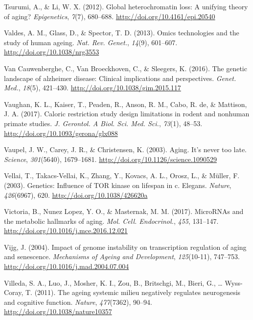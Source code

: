\documentclass[12pt,twoside]{unicam}
\begin{document}
\begin{cslreferences}
\leavevmode\hypertarget{ref-Tsurumi2012}{}%
Tsurumi, A., \& Li, W. X. (2012). Global heterochromatin loss: A unifying theory of aging? \emph{Epigenetics}, \emph{7}(7), 680--688. \url{http://doi.org/10.4161/epi.20540}

\leavevmode\hypertarget{ref-Valdes2013}{}%
Valdes, A. M., Glass, D., \& Spector, T. D. (2013). Omics technologies and the study of human ageing. \emph{Nat. Rev. Genet.}, \emph{14}(9), 601--607. \url{http://doi.org/10.1038/nrg3553}

\leavevmode\hypertarget{ref-VanCauwenberghe2016}{}%
Van Cauwenberghe, C., Van Broeckhoven, C., \& Sleegers, K. (2016). The genetic landscape of alzheimer disease: Clinical implications and perspectives. \emph{Genet. Med.}, \emph{18}(5), 421--430. \url{http://doi.org/10.1038/gim.2015.117}

\leavevmode\hypertarget{ref-Vaughan2017}{}%
Vaughan, K. L., Kaiser, T., Peaden, R., Anson, R. M., Cabo, R. de, \& Mattison, J. A. (2017). Caloric restriction study design limitations in rodent and nonhuman primate studies. \emph{J. Gerontol. A Biol. Sci. Med. Sci.}, \emph{73}(1), 48--53. \url{http://doi.org/10.1093/gerona/glx088}

\leavevmode\hypertarget{ref-Vaupel2003}{}%
Vaupel, J. W., Carey, J. R., \& Christensen, K. (2003). Aging. It's never too late. \emph{Science}, \emph{301}(5640), 1679--1681. \url{http://doi.org/10.1126/science.1090529}

\leavevmode\hypertarget{ref-Vellai2003}{}%
Vellai, T., Takacs-Vellai, K., Zhang, Y., Kovacs, A. L., Orosz, L., \& Müller, F. (2003). Genetics: Influence of TOR kinase on lifespan in c. Elegans. \emph{Nature}, \emph{426}(6967), 620. \url{http://doi.org/10.1038/426620a}

\leavevmode\hypertarget{ref-Victoria2017}{}%
Victoria, B., Nunez Lopez, Y. O., \& Masternak, M. M. (2017). MicroRNAs and the metabolic hallmarks of aging. \emph{Mol. Cell. Endocrinol.}, \emph{455}, 131--147. \url{http://doi.org/10.1016/j.mce.2016.12.021}

\leavevmode\hypertarget{ref-Vijg2004}{}%
Vijg, J. (2004). Impact of genome instability on transcription regulation of aging and senescence. \emph{Mechanisms of Ageing and Development}, \emph{125}(10-11), 747--753. \url{http://doi.org/10.1016/j.mad.2004.07.004}

\leavevmode\hypertarget{ref-Villeda2011}{}%
Villeda, S. A., Luo, J., Mosher, K. I., Zou, B., Britschgi, M., Bieri, G., \ldots{} Wyss-Coray, T. (2011). The ageing systemic milieu negatively regulates neurogenesis and cognitive function. \emph{Nature}, \emph{477}(7362), 90--94. \url{http://doi.org/10.1038/nature10357}


\end{cslreferences}
\end{document}
